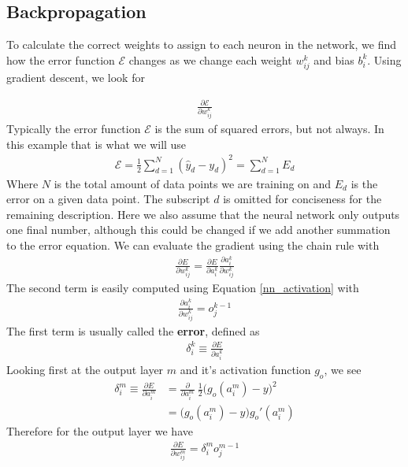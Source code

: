 \subsection{Backpropagation}
To calculate the correct weights to assign to each neuron in the network, we find how the error function $\mathcal{E}$ changes as we change each weight $w_{ij}^k$ and bias $b_i^k$. Using gradient descent, we look for

\begin{align}
	\frac{\partial \mathcal{E}}{\partial w_{ij}^k} 
\end{align}
Typically the error function $\mathcal{E}$ is the sum of squared errors, but not always. In this example that is what we will use
\begin{align}
	\mathcal{E} = \frac{1}{2}\sum_{d=1}^N (\hat{y}_d-y_d)^2 = \sum_{d=1}^N E_d
\end{align}
Where $N$ is the total amount of data points we are training on and $E_{d}$ is the error on a given data point. The subscript $d$ is omitted for conciseness for the remaining description. Here we also assume that the neural network only outputs one final number, although this could be changed if we add another summation to the error equation. We can evaluate the gradient using the chain rule with
\begin{align}\label{neural_net_error}
	\frac{\partial E}{\partial w_{ij}^k} = \frac{\partial E}{\partial a_{i}^k}\frac{\partial a_{i}^k}{\partial w_{ij}^k}
\end{align}
The second term is easily computed using Equation \ref{nn_activation} with
\begin{align}
	\frac{\partial a_{i}^k}{\partial w_{ij}^k} = o_j^{k-1}
\end{align}
The first term is usually called the \textbf{error}, defined as 
\begin{align}
	\delta_{i}^k \equiv \frac{\partial E}{\partial a_{i}^k}
\end{align}
Looking first at the output layer $m$ and it's activation function $g_o$, we see
\begin{align}
	\delta_{i}^m \equiv \frac{\partial E}{\partial a_{i}^m} &= \frac{\partial}{\partial{a_{i}^m}}~\frac{1}{2} \Big(g_o(a_{i}^m)-y\Big)^2\\
	&= \Big(g_o(a_{i}^m)-y\Big)g_o'(a_{i}^m)
\end{align}
Therefore for the output layer we have
\begin{align}
	\frac{\partial E}{\partial w_{ij}^m} = \delta_{i}^m o_j^{m-1}
\end{align}


